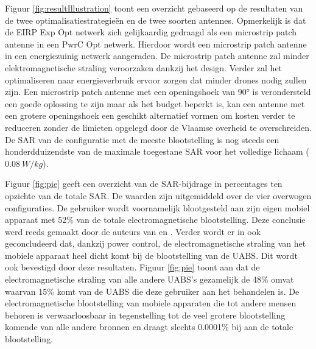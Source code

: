 \documentclass[twocolumn]{phdsymp_dutch}
\begin{document}
Figuur \ref{fig:resultIllustration} toont een overzicht gebaseerd op de resultaten van de twee optimalisatiestrategieën en de twee soorten antennes.
Opmerkelijk is dat de \gls{EIRP} \gls{Exp Opt} netwerk zich gelijkaardig gedraagd als een microstrip patch antenne in een \gls{PwrC Opt} netwerk.
Hierdoor wordt een microstrip patch antenne in een energiezuinig netwerk aangeraden. De microstrip patch antenne zal minder elektromagnetische straling veroorzaken dankzij het design.
Verder zal het optimaliseren naar energieverbruik ervoor zorgen dat minder drones nodig zullen zijn.
Een microstrip patch antenne met een openingshoek van \ang{90} is verondersteld een goede oplossing te zijn
 maar als het budget beperkt is, kan een antenne met een grotere openingshoek een geschikt alternatief vormen
 om kosten verder te reduceren zonder de limieten opgelegd door de Vlaamse overheid te overschreiden.
De \gls{SAR} van de configuratie met de meeste blootstelling is nog steeds een honderdduizendste van de maximale toegestane \gls{SAR} voor het volledige lichaam  ($0.08\ W/kg$).

Figuur \ref{fig:pie} geeft een overzicht van de \gls{SAR}-bijdrage in percentages ten opzichte van de totale \gls{SAR}.
De waarden zijn uitgemiddeld over de vier overwogen configuraties.
De gebruiker wordt voornamelijk blootgesteld aan zijn eigen mobiel apparaat met 
52\% van de totale electromagnetische blootstelling.
Deze conclusie werd reeds gemaakt door de auteurs van 
\cite{J17_kuehn2019modelling} en  \cite{J10.1.1}.
Verder wordt er in \cite{J10.1.1} ook geconcludeerd dat, dankzij power control, 
de electromagnetische straling van het mobiele apparaat heel dicht komt bij de blootstelling van de \gls{UABS}.
Dit wordt ook bevestigd door deze resultaten. Figuur \ref{fig:pie} toont aan dat de electromagnetische straling van 
alle andere \gls{UABS}'s  gezamelijk de 48\% omvat waarvan 15\% komt van de \gls{UABS} die deze gebruiker aan het behandelen is.
De electromagnetische blootstelling van mobiele apparaten die tot andere mensen behoren 
is verwaarloosbaar in tegenstelling tot de veel grotere blootstelling komende van alle andere bronnen
en draagt slechts 0.0001\% bij aan de totale blootstelling.
\end{document}

